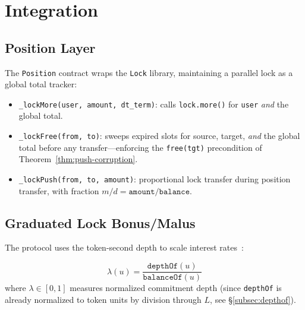\documentclass[10pt,a4paper,twocolumn]{article}
\begin{document}
\section{Integration}
\label{sec:integration}

\subsection{Position Layer}

The \texttt{Position} contract wraps the \texttt{Lock} library, maintaining a parallel lock as a global total tracker:

\begin{itemize}[nosep]
\item \texttt{\_lockMore(user, amount, dt\_term)}: calls \texttt{lock.more()} for \texttt{user} \emph{and} the global total.
\item \texttt{\_lockFree(from, to)}: sweeps expired slots for source, target, \emph{and} the global total before any transfer---enforcing the \texttt{free(tgt)} precondition of Theorem~\ref{thm:push-corruption}.
\item \texttt{\_lockPush(from, to, amount)}: proportional lock transfer during position transfer, with fraction $m/d = \texttt{amount}/\texttt{balance}$.
\end{itemize}

\subsection{Graduated Lock Bonus/Malus}

The protocol uses the token-second depth to scale interest rates~\cite{wp}:

\begin{definition}
\label{def:lock-ratio}
\[
\lambda(u) = \frac{\texttt{depthOf}(u)}{\texttt{balanceOf}(u)}
\]
where $\lambda \in [0,1]$ measures normalized commitment depth (since \texttt{depthOf} is already normalized to token units by division through $L$, see \S\ref{subsec:depthof}).
\end{definition}
\end{document}
